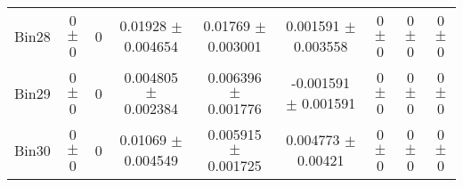 \begin{tabular}{@{\extracolsep{4pt}}lcccccccc@{}}
     Bin28 & 0 $\pm$ 0 & 0 & 0.01928 $\pm$ 0.004654 & 0.01769 $\pm$ 0.003001 & 0.001591 $\pm$ 0.003558 & 0 $\pm$ 0 & 0 $\pm$ 0 & 0 $\pm$ 0 \\ 
     Bin29 & 0 $\pm$ 0 & 0 & 0.004805 $\pm$ 0.002384 & 0.006396 $\pm$ 0.001776 & -0.001591 $\pm$ 0.001591 & 0 $\pm$ 0 & 0 $\pm$ 0 & 0 $\pm$ 0 \\ 
     Bin30 & 0 $\pm$ 0 & 0 & 0.01069 $\pm$ 0.004549 & 0.005915 $\pm$ 0.001725 & 0.004773 $\pm$ 0.00421 & 0 $\pm$ 0 & 0 $\pm$ 0 & 0 $\pm$ 0 \\ 
\hline\hline
  \end{tabular}
